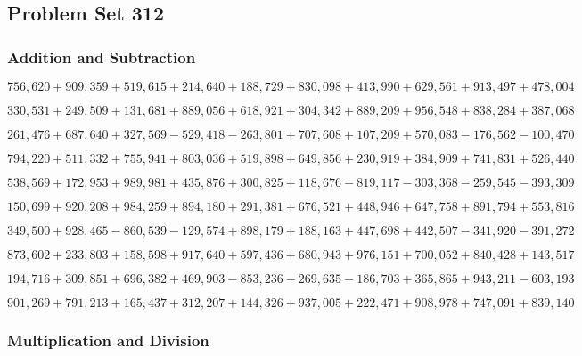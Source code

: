 \hypertarget{problem-set-312}{%
\subsection{Problem Set 312}\label{problem-set-312}}

\hypertarget{addition-and-subtraction}{%
\subsubsection{Addition and
Subtraction}\label{addition-and-subtraction}}

\(756,620+909,359+519,615+214,640+188,729+830,098+413,990+629,561+913,497+478,004\)

\(330,531+249,509+131,681+889,056+618,921+304,342+889,209+956,548+838,284+387,068\)

\(261,476+687,640+327,569-529,418-263,801+707,608+107,209+570,083-176,562-100,470\)

\(794,220+511,332+755,941+803,036+519,898+649,856+230,919+384,909+741,831+526,440\)

\(538,569+172,953+989,981+435,876+300,825+118,676-819,117-303,368-259,545-393,309\)

\(150,699+920,208+984,259+894,180+291,381+676,521+448,946+647,758+891,794+553,816\)

\(349,500+928,465-860,539-129,574+898,179+188,163+447,698+442,507-341,920-391,272\)

\(873,602+233,803+158,598+917,640+597,436+680,943+976,151+700,052+840,428+143,517\)

\(194,716+309,851+696,382+469,903-853,236-269,635-186,703+365,865+943,211-603,193\)

\(901,269+791,213+165,437+312,207+144,326+937,005+222,471+908,978+747,091+839,140\)

\hypertarget{multiplication-and-division}{%
\subsubsection{Multiplication and
Division}\label{multiplication-and-division}}

